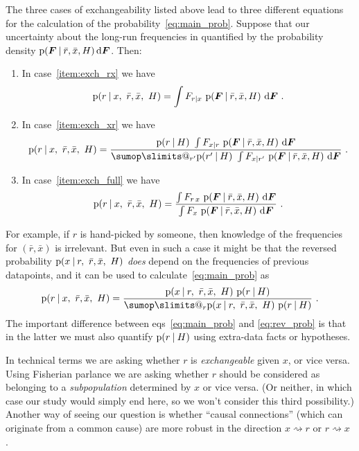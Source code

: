 \documentclass[\ifafour a4paper,12pt,\else a5paper,10pt,\fi%
onecolumn,oneside,article,%
british%
]{memoir}
\makeatletter
\theoremstyle{remark}
\theoremstyle{innote}
\def\sum{\DOTSI\sumop\slimits@}
\newcommand*{\citey}{\parencites*}
\newcommand*{\di}{\mathrm{d}}%
\newcommand*{\p}{\mathrm{p}}%
\renewcommand*{\|}[1][]{\nonscript\:#1\vert\nonscript\:\mathopen{}}
\renewcommand*{\=}{\TextOrMath\texteq\eq}
\newcommand*{\sects}{\S\S}%
\newcommand*{\eqns}{eqs}%
\newcommand*{\cf}{{cf.}}
\newcommand*{\q}{}%
\DeclareRobustCommand*{\q}{%
  \mathord{\mathpalette\bigcdot@{}}%
}
\newcommand*{\bigcdot@scalefactor}{0.7}
\newcommand*{\bigcdot@widthfactor}{1.5}
\newcommand*{\bigcdot@}[2]{%
  \sbox0{$#1\vcenter{}$}%
  \sbox2{$#1\cdot\m@th$}%
  \hbox to \bigcdot@widthfactor\wd2{%
    \hfil
    \raise\ht0\hbox{%
      \scalebox{\bigcdot@scalefactor}{%
        \lower\ht0\hbox{$#1\bullet\m@th$}%
      }%
    }%
    \hfil
  }%
}
\newcommand*{\ro}{r}
\newcommand*{\xo}{x}
\newcommand*{\rd}{\bar{r}}
\newcommand*{\xd}{\bar{x}}
\newcommand*{\yF}{\bm{F}}
\makeatother
\begin{document}
The three cases of exchangeability listed above lead to three different
equations for the calculation of the probability~\eqref{eq:main_prob}.
Suppose that our uncertainty about the long-run frequencies in quantified
by the probability density $\p(\yF\|\rd,\xd, H)\,\di\yF$. Then:
\begin{enumerate}[label=\Roman*.]
\item In case~\ref{item:exch_rx} we have
  \begin{equation}
    \label{eq:prob_rx_case_rx}
    \p(\ro \| \xo,\ \rd,\xd,\ H) =
    \int F_{\ro\mid\xo} \ \p(\yF\|\rd,\xd, H)\ \di\yF \ .
  \end{equation}
\item In case~\ref{item:exch_xr} we have
  \begin{equation}
    \label{eq:prob_rx_case_xr}
    \p(\ro \| \xo,\ \rd,\xd,\ H) =
    \frac{
     \p(\ro\| H)\  \int F_{\xo\mid\ro} \ \p(\yF\|\rd,\xd, H)\ \di\yF
    }{
     \sum_{r'} \p(r' \| H)\  \int F_{\xo\mid r'} \ \p(\yF\|\rd,\xd, H)\ \di\yF
      } \ .
  \end{equation}
\item In case~\ref{item:exch_full} we have
  \begin{equation}
    \label{eq:prob_rx_case_full}
    \p(\ro \| \xo,\ \rd,\xd,\ H) =
    \frac{
     \int F_{\ro\,\xo} \ \p(\yF\|\rd,\xd, H)\ \di\yF
    }{
     \int F_{\q\xo} \ \p(\yF\|\rd,\xd, H)\ \di\yF
      } \ .
  \end{equation}
\end{enumerate}

For example, if $\ro$ is
hand-picked by someone, then knowledge of the frequencies for $(\rd,\xd)$
is irrelevant. But even in such a case it might be that the reversed
probability $\p(\xo \| \ro,\ \rd,\xd,\ H)$ \emph{does} depend on the
frequencies of previous datapoints, and it can be used to
calculate~\eqref{eq:main_prob} as
\begin{equation}
  \label{eq:rev_prob}
  \p(\ro \| \xo,\ \rd,\xd,\ H) =
  \frac{\p(\xo \| \ro,\ \rd,\xd,\ H)\ \p(\ro \| H)}{
    \sum_{\ro}\p(\xo \| \ro,\ \rd,\xd,\ H)\ \p(\ro \| H)}
\ .
\end{equation}
The important difference between \eqns~\eqref{eq:main_prob} and
\eqref{eq:rev_prob} is that in the latter we must also quantify
$\p(\ro \| H)$ using extra-data facts or hypotheses.

In technical terms we are asking whether $\ro$ is \emph{exchangeable}
given $\xo$, or vice versa. Using Fisherian \citey[\sects~II.4,
IV.1]{fisher1956} parlance we are asking whether $\ro$ should be
considered as belonging to a \emph{subpopulation} determined by $\xo$ or
vice versa. (Or neither, in which case our study would simply end here, so
we won't consider this third possibility.) Another way of seeing our
question is whether \enquote{causal connections} (which can originate from
a common cause) are more robust in the direction
$\xo \rightsquigarrow \ro$ or $\ro \rightsquigarrow \xo$
\parencites[\cf][\sects~2.1.2, 2.2.5]{pearl1988}.
\end{document}
